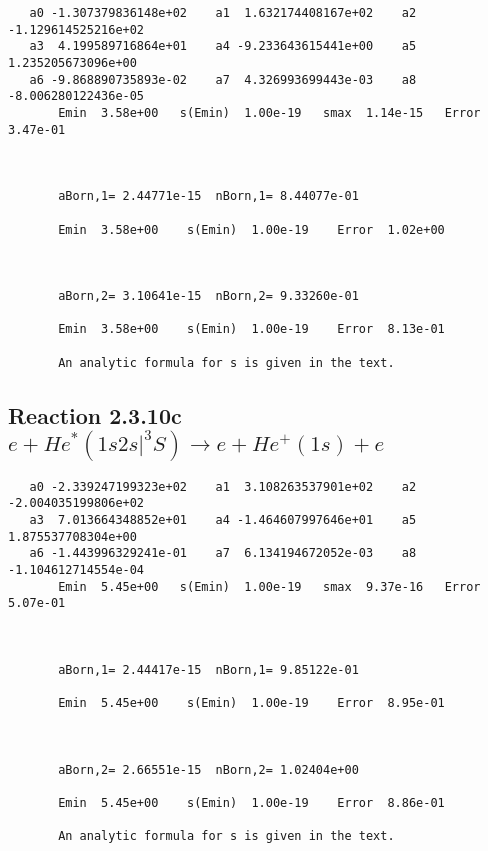 \documentclass[12pt]{article}
\begin{document}
\begin{small}\begin{verbatim}
   a0 -1.307379836148e+02    a1  1.632174408167e+02    a2 -1.129614525216e+02
   a3  4.199589716864e+01    a4 -9.233643615441e+00    a5  1.235205673096e+00
   a6 -9.868890735893e-02    a7  4.326993699443e-03    a8 -8.006280122436e-05
       Emin  3.58e+00   s(Emin)  1.00e-19   smax  1.14e-15   Error  3.47e-01



       aBorn,1= 2.44771e-15  nBorn,1= 8.44077e-01

       Emin  3.58e+00    s(Emin)  1.00e-19    Error  1.02e+00



       aBorn,2= 3.10641e-15  nBorn,2= 9.33260e-01

       Emin  3.58e+00    s(Emin)  1.00e-19    Error  8.13e-01

       An analytic formula for s is given in the text.
\end{verbatim}\end{small}




\newpage
\subsection{
Reaction 2.3.10c $e + He^*(1s2s|^3S) \rightarrow e + He^+(1s) + e$}

















\begin{small}\begin{verbatim}
   a0 -2.339247199323e+02    a1  3.108263537901e+02    a2 -2.004035199806e+02
   a3  7.013664348852e+01    a4 -1.464607997646e+01    a5  1.875537708304e+00
   a6 -1.443996329241e-01    a7  6.134194672052e-03    a8 -1.104612714554e-04
       Emin  5.45e+00   s(Emin)  1.00e-19   smax  9.37e-16   Error  5.07e-01



       aBorn,1= 2.44417e-15  nBorn,1= 9.85122e-01

       Emin  5.45e+00    s(Emin)  1.00e-19    Error  8.95e-01



       aBorn,2= 2.66551e-15  nBorn,2= 1.02404e+00

       Emin  5.45e+00    s(Emin)  1.00e-19    Error  8.86e-01

       An analytic formula for s is given in the text.
\end{verbatim}\end{small}
\end{document}

